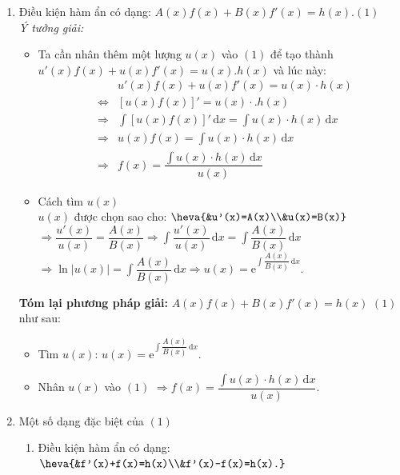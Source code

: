 \begin{dang}{}
	\begin{enumerate}
		\item Điều kiện hàm ẩn có dạng: $A(x)f(x)+B(x)f'(x)=h(x)$.\quad$(1)$\\
		\textit{Ý tưởng giải:}
		\begin{itemize}
			\item Ta cần nhân thêm một lượng $u(x)$ vào $(1)$ để tạo thành   $u'(x)f(x)+u(x)f'(x)=u(x).h(x)$ và lúc này:
			\allowdisplaybreaks
			\begin{eqnarray*}
				& & u'(x)f(x)+u(x)f'(x)=u(x)\cdot h(x)\\
				&\Leftrightarrow & \left[u(x)f(x)\right]'=u(x)\cdot .h(x)\\
				&\Rightarrow& \displaystyle\int \left[u(x)f(x)\right]'\mathrm{\,d}x= \displaystyle\int u(x)\cdot h(x)\mathrm{\,d}x\\
				&\Rightarrow& u(x)f(x)=\displaystyle\int u(x)\cdot h(x)\mathrm{\,d}x\\
				&\Rightarrow& f(x)=\dfrac{\displaystyle\int u(x)\cdot h(x)\mathrm{\,d}x}{u(x)}
			\end{eqnarray*}
			\item Cách tìm $u(x)$\\
			$u(x)$ được chọn sao cho: $\heva{&u'(x)=A(x)\\&u(x)=B(x)}$\\
			$\Rightarrow \dfrac{u'(x)}{u(x)}=\dfrac{A(x)}{B(x)} \Rightarrow \displaystyle\int \dfrac{u'(x)}{u(x)}\mathrm{\,d}x =\displaystyle\int\dfrac{A(x)}{B(x)}\mathrm{\,d}x$\\ $\Rightarrow \ln \left|u(x)\right|=\displaystyle\int \dfrac{A(x)}{B(x)}\mathrm{\,d}x \Rightarrow u(x)=\mathrm{e}^{\displaystyle\int \dfrac{A(x)}{B(x)}\mathrm{\,d}x}$.\\
		\end{itemize}
		\textbf{Tóm lại phương pháp giải:} $A(x)f(x)+B(x)f'(x)=h(x)$ $(1)$ như sau:
		\begin{itemize}
			\item Tìm $u(x)$: $u(x)=\mathrm{e}^{\displaystyle\int \dfrac{A(x)}{B(x)} \mathrm{\,d}x}$.
			\item Nhân $u(x)$ vào $(1)$ $\Rightarrow f(x)=\dfrac{\displaystyle\int{u(x)\cdot h(x)} \mathrm{\,d}x}{u(x)}$. 
		\end{itemize}
		\item Một số dạng đặc biệt của $(1)$
		\begin{enumerate}
			\item Điều kiện hàm ẩn có dạng: $\heva{&f'(x)+f(x)=h(x)\\&f'(x)-f(x)=h(x).}$\\

\end{enumerate}
\end{enumerate}
\end{dang}
